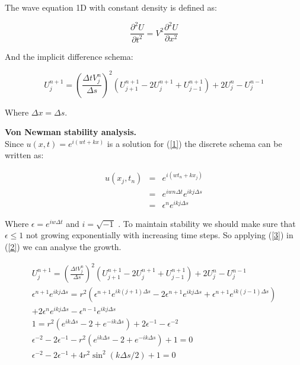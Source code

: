 \documentclass[legalpaper, 12pt]{book}
\begin{document}
The wave equation 1D with constant density is defined as:

\begin{equation}
\frac{\partial^2 U}{\partial t ^2} = V^2 \frac{\partial^2 U}{\partial x ^2}
\label{1}
\end{equation}

And the implicit difference schema:


\begin{equation}
U_j^{n+1}  =  \left( \frac{\Delta t  V_j^n}{\Delta s} \right) ^2 \left(  U_{j+1}^{n+1} - 2 U_j^{n+1} + U_{j-1}^{n+1}  \right) + 2 U_j^n - U_j^{n-1}
\label{2}
\end{equation}

Where $\Delta x = \Delta s $.

\textbf{Von Newman stability analysis.}
\\

Since $ u(x,t) = e^{i(wt+kx)} $ is a solution for (\ref{1}) the discrete schema can be written as:

\begin{eqnarray}
u(x_j,t_n) &=& e^{i(wt_n+kx_j)} \nonumber \\
&=& e^{iwn\Delta t} e^{ikj\Delta s} \nonumber \\
&=& \epsilon^n e^{ikj\Delta s}
\label{3}
\end{eqnarray}


Where $\epsilon = e^{iw \Delta t} $ and $ i = \sqrt{-1} $ . 
To maintain stability we should make sure that $ \epsilon \leq 1 $ not growing exponentially with increasing time steps. So applying (\ref{3}) in (\ref{2}) we can analyse the growth.

\begin{multline}
 U_j^{n+1}  =  \left( \frac{\Delta t  V_j^n}{\Delta s} \right) ^2 \left(  U_{j+1}^{n+1} - 2 U_j^{n+1} + U_{j-1}^{n+1}  \right) + 2 U_j^n - U_j^{n-1} \\
\epsilon^{n+1} e^{ikj\Delta s}  =  r^2 \left(  \epsilon^{n+1} e^{ik(j+1)\Delta s}  - 2 \epsilon^{n+1} e^{ikj\Delta s} + \epsilon^{n+1} e^{ik(j-1)\Delta s}  \right) \\ 
+ 2 \epsilon^n e^{ikj\Delta s}  - \epsilon^{n-1} e^{ikj\Delta s} \\
 1 = r^2 (e^{ik\Delta s} -2 + e^{-ik\Delta s}) + 2 \epsilon^{-1} - \epsilon^{-2} \\
\epsilon^{-2} - 2 \epsilon^{-1} -  r^2 (e^{ik\Delta s} -2 + e^{-ik\Delta s}) + 1 = 0  \\
\epsilon^{-2} - 2 \epsilon^{-1} + 4 r^2 \sin^2 \left( k \Delta s / 2 \right) + 1 = 0   
 \label{4}
\end{multline}
\end{document}
